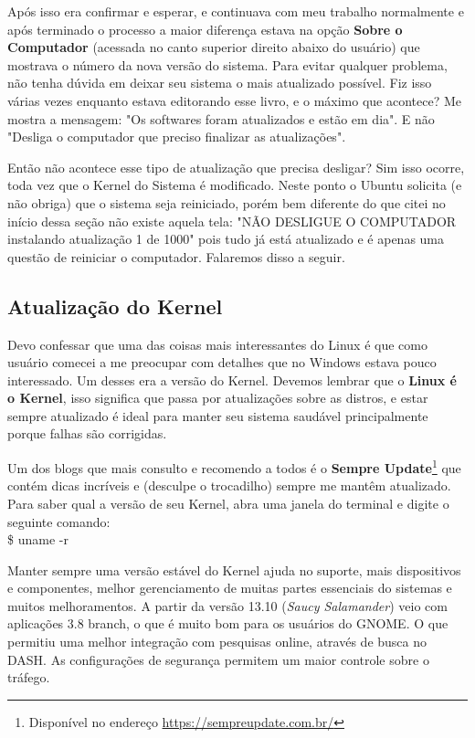 Após isso era confirmar e esperar, e continuava com meu trabalho normalmente e após terminado o processo a maior diferença estava na opção \textbf{Sobre o Computador} (acessada no canto superior direito abaixo do usuário) que mostrava o número da nova versão do sistema. Para evitar qualquer problema, não tenha dúvida em deixar seu sistema o mais atualizado possível. Fiz isso várias vezes enquanto estava editorando esse livro, e o máximo que acontece? Me mostra a mensagem: "Os softwares foram atualizados e estão em dia". E não "Desliga o computador que preciso finalizar as atualizações".

Então não acontece esse tipo de atualização que precisa desligar? Sim isso ocorre, toda vez que o Kernel do Sistema é modificado. Neste ponto o Ubuntu solicita (e não obriga) que o sistema seja reiniciado, porém bem diferente do que citei no início dessa seção não existe aquela tela: "NÃO DESLIGUE O COMPUTADOR instalando atualização 1 de 1000" pois tudo já está atualizado e é apenas uma questão de reiniciar o computador. Falaremos disso a seguir.

\subsection{Atualização do Kernel}
Devo confessar que uma das coisas mais interessantes do Linux é que como usuário comecei a me preocupar com detalhes que no Windows estava pouco interessado. Um desses era a versão do Kernel. Devemos lembrar que o \textbf{Linux é o Kernel}, isso significa que passa por atualizações sobre as distros, e estar sempre atualizado é ideal para manter seu sistema saudável principalmente porque falhas são corrigidas.

Um dos blogs que mais consulto e recomendo a todos é o \textbf{Sempre Update}\footnote{Disponível no endereço \url{https://sempreupdate.com.br/}} que contém dicas incríveis e (desculpe o trocadilho) sempre me mantêm atualizado. Para saber qual a versão de seu Kernel, abra uma janela do terminal e digite o seguinte comando: \\
{\ttfamily\$ uname -r}

Manter sempre uma versão estável do Kernel ajuda no suporte, mais dispositivos e componentes, melhor gerenciamento de muitas partes essenciais do sistemas e muitos melhoramentos. A partir da versão 13.10 (\textit{Saucy Salamander}) veio com aplicações 3.8 branch, o que é muito bom para os usuários do GNOME. O que permitiu uma melhor integração com pesquisas online, através de busca no DASH. As configurações de segurança permitem um maior controle sobre o tráfego. 

